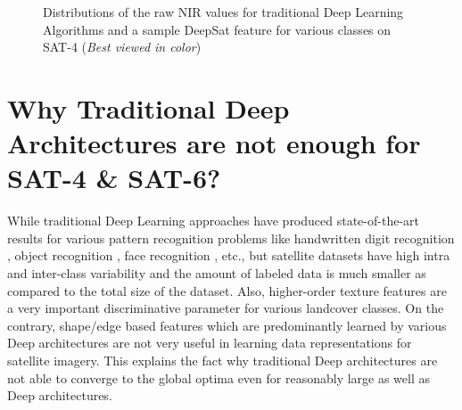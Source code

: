 \documentclass[11pt,a4paper]{article}
\begin{document}
\begin{figure*}
\centering
{}
\caption{Distributions of the raw NIR values for traditional Deep Learning Algorithms and a sample DeepSat feature for various classes on SAT-4 (\emph{Best viewed in color})}
\label{fig:distributions}
\end{figure*}


\section{Why Traditional Deep Architectures are not enough for SAT-4  \& SAT-6?}
While traditional Deep Learning approaches have produced state-of-the-art results for various pattern recognition problems like handwritten digit recognition \cite{mnist}, object recognition \cite{Krizhevsky09learningmultiple}, face recognition \cite{DeepFace2013}, etc., but satellite datasets have high intra and inter-class variability and the amount of labeled data is much smaller as compared to the total size of the dataset. Also, higher-order texture features are a very important discriminative parameter for various landcover classes. On the contrary, shape/edge based features which are predominantly learned by various Deep architectures are not very useful in learning data representations for satellite imagery. This explains the fact why traditional Deep architectures are not able to converge to the global optima even for reasonably large as well as Deep architectures. 
\end{document}
